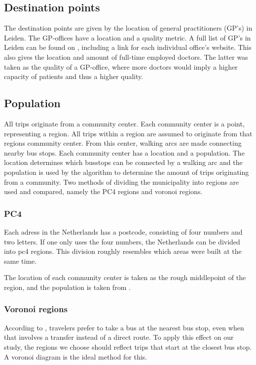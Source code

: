 \subsection{Destination points}
The destination points are given by the location of general practitioners (GP's) in Leiden. The GP-offices have a location and a quality metric. A full list of GP's in Leiden can be found on \cite{zorgkaart}, including a link for each individual office's website. This also gives the location and amount of full-time employed doctors. The latter was taken as the quality of a GP-office, where more doctors would imply a higher capacity of patients and thus a higher quality.

\subsection{Population}
All trips originate from a community center. Each community center is a point, representing a region. All trips within a region are assumed to originate from that regions community center. From this center, walking arcs are made connecting nearby bus stops. Each community center has a location and a population. The location determines which busstops can be connected by a walking arc and the population is used by the algorithm to determine the amount of trips originating from a community. Two methods of dividing the municipality into regions are used and compared, namely the PC4 regions and voronoi regions.
\subsubsection{PC4}
Each adress in the Netherlands has a postcode, consisting of four numbers and two letters. If one only uses the four numbers, the Netherlands can be divided into pc4 regions. This division roughly resembles which areas were built at the same time.

The location of each community center is taken as the rough middlepoint of the region, and the population is taken from \cite{allecijfers}.

\subsubsection{Voronoi regions}
According to \cite{wang}, travelers prefer to take a bus at the nearest bus stop, even when that involves a transfer instead of a direct route. To apply this effect on our study, the regions we choose should reflect trips that start at the closest bus stop. A voronoi diagram is the ideal method for this.


